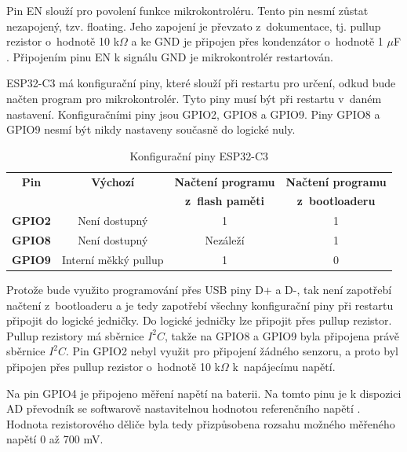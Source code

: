 Pin EN slouží pro povolení funkce mikrokontroléru. Tento pin nesmí zůstat nezapojený, tzv. floating. Jeho zapojení je převzato z~dokumentace, tj. pullup rezistor o~hodnotě 
10 k$\Omega$ a ke GND je připojen přes kondenzátor o~hodnotě 1 $\mu$F \cite{ESP_C3_dtsh}. Připojením pinu EN k signálu GND je mikrokontrolér restartován. 

ESP32-C3 má konfigurační piny, které slouží při restartu pro určení, odkud bude načten program pro mikrokontrolér. Tyto piny musí být při restartu v~daném nastavení. 
Konfiguračními piny jsou GPIO2, GPIO8 a GPIO9. Piny GPIO8 a GPIO9 nesmí být nikdy nastaveny současně do logické nuly. 

\begin{table}[!h]
  \caption[Konfigurační piny ESP32-C3]{Konfigurační piny ESP32-C3 \cite{ESP_C3_dtsh}}
  \begin{center}
  	\small
	  \begin{tabular}{|c|c|c|c|}
	    \hline
	    \textbf{Pin}	& \textbf{Výchozí}	& \textbf{Načtení programu} & \textbf{Načtení programu} \\
      \textbf{}	& \textbf{}	& \textbf{z~flash paměti} & \textbf{z~bootloaderu} \\
	    \hline
	    \textbf{GPIO2}	& Není dostupný & 1 & 1 \\ 
	    \hline
	    \textbf{GPIO8}	& Není dostupný & Nezáleží & 1 \\ 
	    \hline
	    \textbf{GPIO9} & Interní měkký pullup & 1 & 0 \\
	    \hline
	  \end{tabular}
  \end{center}
\end{table}

Protože bude využito programování přes USB piny D+ a D-, tak není zapotřebí načtení z~bootloaderu a je tedy zapotřebí všechny konfigurační piny při restartu připojit do 
logické jedničky. Do logické jedničky lze připojit přes pullup rezistor. Pullup rezistory má sběrnice $I^2C$, takže na GPIO8 a GPIO9 byla připojena právě sběrnice $I^2C$.
Pin GPIO2 nebyl využit pro připojení žádného senzoru, a proto byl připojen přes pullup rezistor o~hodnotě 10 k$\Omega$ k~napájecímu napětí.

Na pin GPIO4 je připojeno měření napětí na baterii. Na tomto pinu je k dispozici AD převodník se softwarově nastavitelnou hodnotou referenčního napětí \cite{ESP_C3_tech_ref}. 
Hodnota rezistorového děliče byla tedy přizpůsobena rozsahu možného měřeného napětí 0 až 700 mV. 

